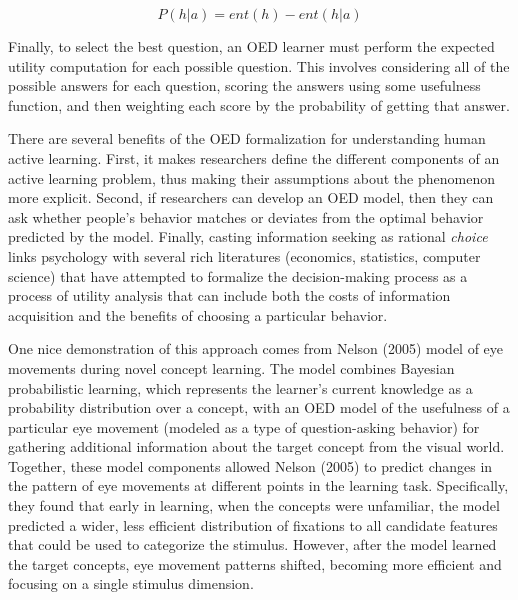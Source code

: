 \documentclass[a4paper,man,apacite,floatsintext]{apa6}
\begin{document}
\[P(h|a) = ent(h) - ent(h|a)\]

Finally, to select the best question, an OED learner must perform the
expected utility computation for each possible question. This involves
considering all of the possible answers for each question, scoring the
answers using some usefulness function, and then weighting each score by
the probability of getting that answer.

There are several benefits of the OED formalization for understanding
human active learning. First, it makes researchers define the different
components of an active learning problem, thus making their assumptions
about the phenomenon more explicit. Second, if researchers can develop
an OED model, then they can ask whether people's behavior matches or
deviates from the optimal behavior predicted by the model. Finally,
casting information seeking as rational \emph{choice} links psychology
with several rich literatures (economics, statistics, computer science)
that have attempted to formalize the decision-making process as a
process of utility analysis that can include both the costs of
information acquisition and the benefits of choosing a particular
behavior.

One nice demonstration of this approach comes from Nelson (2005) model
of eye movements during novel concept learning. The model combines
Bayesian probabilistic learning, which represents the learner's current
knowledge as a probability distribution over a concept, with an OED
model of the usefulness of a particular eye movement (modeled as a type
of question-asking behavior) for gathering additional information about
the target concept from the visual world. Together, these model
components allowed Nelson (2005) to predict changes in the pattern of
eye movements at different points in the learning task. Specifically,
they found that early in learning, when the concepts were unfamiliar,
the model predicted a wider, less efficient distribution of fixations to
all candidate features that could be used to categorize the stimulus.
However, after the model learned the target concepts, eye movement
patterns shifted, becoming more efficient and focusing on a single
stimulus dimension.
\end{document}
